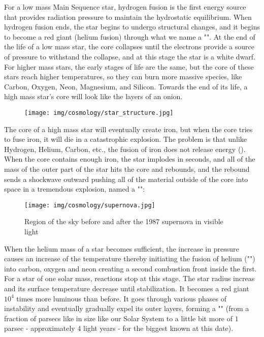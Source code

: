 	For a low mass Main Sequence star, hydrogen fusion is the first energy source that provides radiation pressure to maintain the hydrostatic equilibrium. When hydrogen fusion ends, the star begins to undergo structural changes, and it begins to become a red giant (helium fusion) through what we name a "". At the end of the life of a low mass star, the core collapses until the electrons provide a source of pressure to withstand the collapse, and at this stage the star is a white dwarf. For higher mass stars, the early stages of life are the same, but the core of these stars reach higher temperatures, so they can burn more massive species, like Carbon, Oxygen, Neon, Magnesium, and Silicon. Towards the end of its life, a high mass star's core will look like the layers of an onion.
	\begin{figure}[H]
		\begin{center}
		\texttt{[image: img/cosmology/star\_structure.jpg]}
		\end{center}	
	\end{figure}
	The core of a high mass star will eventually create iron, but when the core tries to fuse iron, it will die in a catastrophic explosion. The problem is that unlike Hydrogen, Helium, Carbon, etc., the fusion of iron does not release energy (). When the core contains enough iron, the star implodes in seconds, and all of the mass of the outer part of the star hits the core and rebounds, and the rebound sends a shockwave outward pushing all of the material outside of the core into space in a tremendous explosion, named a "":
	\begin{figure}[H]
		\begin{center}
		\texttt{[image: img/cosmology/supernova.jpg]}
		\caption{Region of the sky before and after the 1987 supernova in visible light}
		\end{center}	
	\end{figure}
	When the helium mass of a star becomes sufficient, the increase in pressure causes an increase of the temperature thereby initiating the fusion of helium ("") into carbon, oxygen and neon creating a second combustion front inside the first. For a star of one solar mass, reactions stop at this stage. The star radius increas and its surface temperature decrease until stabilization. It becomes a red giant $10^4$ times more luminous than before. It goes through various phases of instability and eventually gradually expel its outer layers, forming a "" (from a fraction of parsecs like in size like our Solar System to a little bit more of $1$ parsec - approximately $4$ light years - for the biggest known at this date). 
